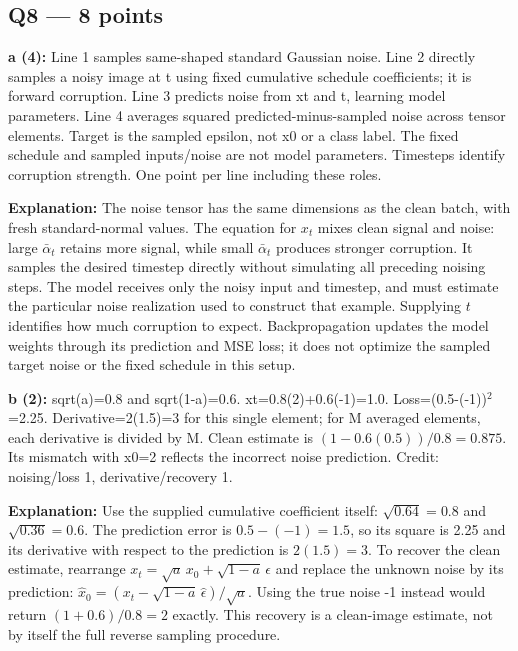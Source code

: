 \documentclass[11pt]{article}
\begin{document}
\subsection*{Q8 — 8 points}

\textbf{a (4):} Line 1 samples same-shaped standard Gaussian noise. Line 2 directly samples a noisy image at t using fixed cumulative schedule coefficients; it is forward corruption. Line 3 predicts noise from xt and t, learning model parameters. Line 4 averages squared predicted-minus-sampled noise across tensor elements. Target is the sampled epsilon, not x0 or a class label. The fixed schedule and sampled inputs/\allowbreak{}noise are not model parameters. Timesteps identify corruption strength. One point per line including these roles.

\textbf{Explanation:} The noise tensor has the same dimensions as the clean batch, with fresh standard-normal values. The equation for $x_t$ mixes clean signal and noise: large $\bar\alpha_t$ retains more signal, while small $\bar\alpha_t$ produces stronger corruption. It samples the desired timestep directly without simulating all preceding noising steps. The model receives only the noisy input and timestep, and must estimate the particular noise realization used to construct that example. Supplying $t$ identifies how much corruption to expect. Backpropagation updates the model weights through its prediction and MSE loss; it does not optimize the sampled target noise or the fixed schedule in this setup.

\textbf{b (2):} sqrt(a)=0.8 and sqrt(1-a)=0.6. xt=0.8(2)+0.6(-1)=1.0. Loss=(0.5-(-1))\ensuremath{{}^2}=2.25. Derivative=2(1.5)=3 for this single element; for M averaged elements, each derivative is divided by M. Clean estimate is $(1-0.6(0.5))/0.8=0.875$. Its mismatch with x0=2 reflects the incorrect noise prediction. Credit: noising/\allowbreak{}loss 1, derivative/\allowbreak{}recovery 1.

\textbf{Explanation:} Use the supplied cumulative coefficient itself: $\sqrt{0.64}=0.8$ and $\sqrt{0.36}=0.6$. The prediction error is $0.5-(-1)=1.5$, so its square is 2.25 and its derivative with respect to the prediction is $2(1.5)=3$. To recover the clean estimate, rearrange $x_t=\sqrt a\,x_0+\sqrt{1-a}\,\epsilon$ and replace the unknown noise by its prediction: $\hat x_0=(x_t-\sqrt{1-a}\,\hat\epsilon)/\sqrt a$. Using the true noise -1 instead would return $(1+0.6)/0.8=2$ exactly. This recovery is a clean-image estimate, not by itself the full reverse sampling procedure.
\end{document}
